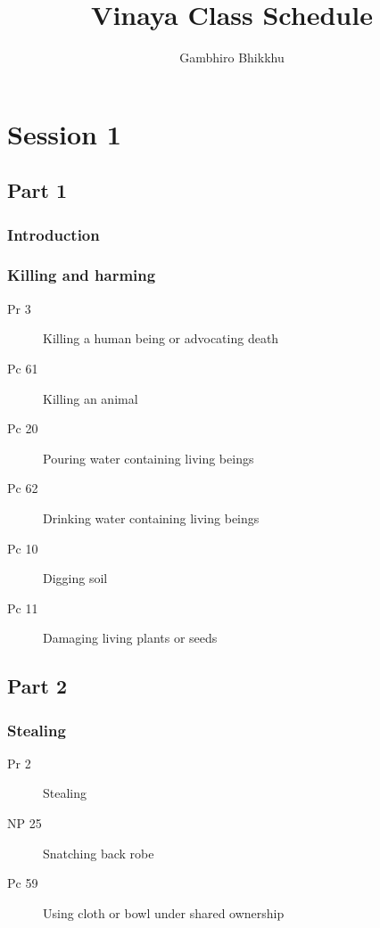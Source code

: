 \documentclass[11pt,oneside]{memoir}
\title{Vinaya Class Schedule}
\author{Gambhiro Bhikkhu}
\begin{document}
\chapter{Session 1}

\begin{multicols}{2}

\section{Part 1}

\subsection{Introduction}

\subsection{Killing and harming}

\begin{description}
\item[Pr 3] Killing a human being or advocating death
\item[Pc 61] Killing an animal
\item[Pc 20] Pouring water containing living beings
\item[Pc 62] Drinking water containing living beings
\item[Pc 10] Digging soil
\item[Pc 11] Damaging living plants or seeds
\end{description}

\columnbreak

\section{Part 2}

\subsection{Stealing}

\begin{description}
\item[Pr 2] Stealing
\item[NP 25] Snatching back robe
\item[Pc 59] Using cloth or bowl under shared ownership
\end{description}

\end{multicols}
\end{document}
